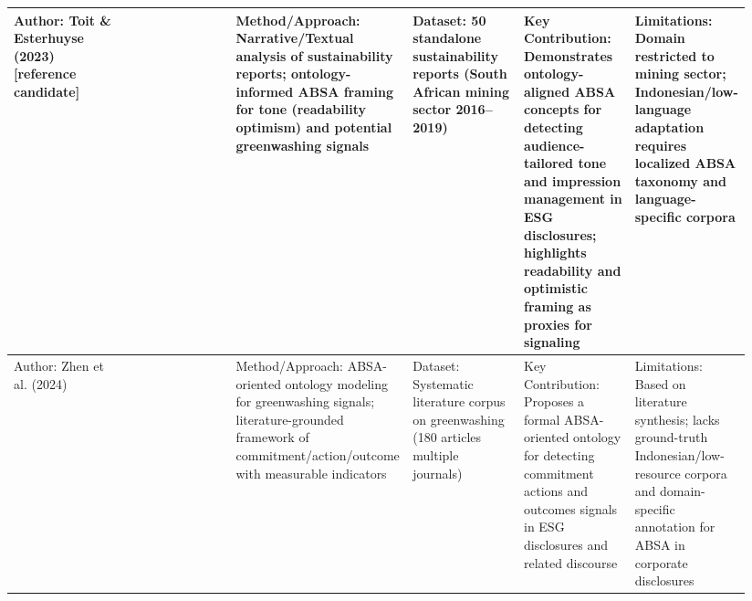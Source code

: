 \documentclass{article}
\begin{document}
\begin{landscape}
\begin{longtable}{p{0.157\linewidth} p{0.157\linewidth} p{0.157\linewidth} p{0.157\linewidth} p{0.157\linewidth} p{0.157\linewidth}}
Author: Toit \& Esterhuyse (2023) [reference candidate] & ~ & Method/Approach: Narrative/Textual analysis of sustainability reports; ontology-informed ABSA framing for tone (readability optimism) and potential greenwashing signals & Dataset: 50 standalone sustainability reports (South African mining sector 2016–2019) & Key Contribution: Demonstrates ontology-aligned ABSA concepts for detecting audience-tailored tone and impression management in ESG disclosures; highlights readability and optimistic framing as proxies for signaling & Limitations: Domain restricted to mining sector; Indonesian/low-language adaptation requires localized ABSA taxonomy and language-specific corpora \\ \hline
Author: Zhen et al. (2024) & ~ & Method/Approach: ABSA-oriented ontology modeling for greenwashing signals; literature-grounded framework of commitment/action/outcome with measurable indicators & Dataset: Systematic literature corpus on greenwashing (180 articles multiple journals) & Key Contribution: Proposes a formal ABSA-oriented ontology for detecting commitment actions and outcomes signals in ESG disclosures and related discourse & Limitations: Based on literature synthesis; lacks ground-truth Indonesian/low-resource corpora and domain-specific annotation for ABSA in corporate disclosures \\ \hline
\end{longtable}
\end{landscape}
\end{document}

